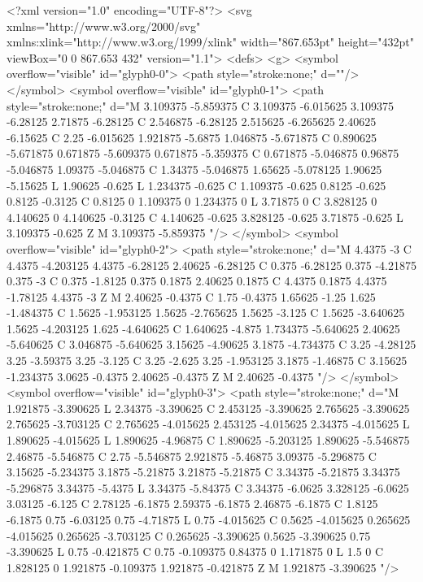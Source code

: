 <?xml version="1.0" encoding="UTF-8"?>
<svg xmlns="http://www.w3.org/2000/svg" xmlns:xlink="http://www.w3.org/1999/xlink" width="867.653pt" height="432pt" viewBox="0 0 867.653 432" version="1.1">
<defs>
<g>
<symbol overflow="visible" id="glyph0-0">
<path style="stroke:none;" d=""/>
</symbol>
<symbol overflow="visible" id="glyph0-1">
<path style="stroke:none;" d="M 3.109375 -5.859375 C 3.109375 -6.015625 3.109375 -6.28125 2.71875 -6.28125 C 2.546875 -6.28125 2.515625 -6.265625 2.40625 -6.15625 C 2.25 -6.015625 1.921875 -5.6875 1.046875 -5.671875 C 0.890625 -5.671875 0.671875 -5.609375 0.671875 -5.359375 C 0.671875 -5.046875 0.96875 -5.046875 1.09375 -5.046875 C 1.34375 -5.046875 1.65625 -5.078125 1.90625 -5.15625 L 1.90625 -0.625 L 1.234375 -0.625 C 1.109375 -0.625 0.8125 -0.625 0.8125 -0.3125 C 0.8125 0 1.109375 0 1.234375 0 L 3.71875 0 C 3.828125 0 4.140625 0 4.140625 -0.3125 C 4.140625 -0.625 3.828125 -0.625 3.71875 -0.625 L 3.109375 -0.625 Z M 3.109375 -5.859375 "/>
</symbol>
<symbol overflow="visible" id="glyph0-2">
<path style="stroke:none;" d="M 4.4375 -3 C 4.4375 -4.203125 4.4375 -6.28125 2.40625 -6.28125 C 0.375 -6.28125 0.375 -4.21875 0.375 -3 C 0.375 -1.8125 0.375 0.1875 2.40625 0.1875 C 4.4375 0.1875 4.4375 -1.78125 4.4375 -3 Z M 2.40625 -0.4375 C 1.75 -0.4375 1.65625 -1.25 1.625 -1.484375 C 1.5625 -1.953125 1.5625 -2.765625 1.5625 -3.125 C 1.5625 -3.640625 1.5625 -4.203125 1.625 -4.640625 C 1.640625 -4.875 1.734375 -5.640625 2.40625 -5.640625 C 3.046875 -5.640625 3.15625 -4.90625 3.1875 -4.734375 C 3.25 -4.28125 3.25 -3.59375 3.25 -3.125 C 3.25 -2.625 3.25 -1.953125 3.1875 -1.46875 C 3.15625 -1.234375 3.0625 -0.4375 2.40625 -0.4375 Z M 2.40625 -0.4375 "/>
</symbol>
<symbol overflow="visible" id="glyph0-3">
<path style="stroke:none;" d="M 1.921875 -3.390625 L 2.34375 -3.390625 C 2.453125 -3.390625 2.765625 -3.390625 2.765625 -3.703125 C 2.765625 -4.015625 2.453125 -4.015625 2.34375 -4.015625 L 1.890625 -4.015625 L 1.890625 -4.96875 C 1.890625 -5.203125 1.890625 -5.546875 2.46875 -5.546875 C 2.75 -5.546875 2.921875 -5.46875 3.09375 -5.296875 C 3.15625 -5.234375 3.1875 -5.21875 3.21875 -5.21875 C 3.34375 -5.21875 3.34375 -5.296875 3.34375 -5.4375 L 3.34375 -5.84375 C 3.34375 -6.0625 3.328125 -6.0625 3.03125 -6.125 C 2.78125 -6.1875 2.59375 -6.1875 2.46875 -6.1875 C 1.8125 -6.1875 0.75 -6.03125 0.75 -4.71875 L 0.75 -4.015625 C 0.5625 -4.015625 0.265625 -4.015625 0.265625 -3.703125 C 0.265625 -3.390625 0.5625 -3.390625 0.75 -3.390625 L 0.75 -0.421875 C 0.75 -0.109375 0.84375 0 1.171875 0 L 1.5 0 C 1.828125 0 1.921875 -0.109375 1.921875 -0.421875 Z M 1.921875 -3.390625 "/>
